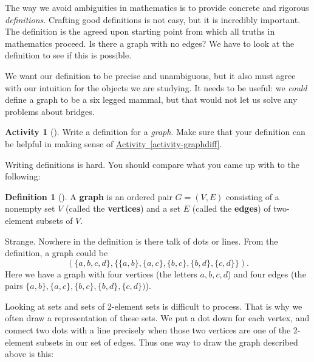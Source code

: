 \documentclass[10pt,]{book}
\newcommand{\terminology}[1]{\textbf{#1}}
\theoremstyle{plain}
\theoremstyle{definition}
\newtheorem{definition}[theorem]{Definition}
\theoremstyle{definition}
\theoremstyle{definition}
\newtheorem{activity}[project]{Activity}
\numberwithin{equation}{chapter}
\newcommand{\vtx}[2]{node[fill,circle,inner sep=0pt, minimum size=4pt,label=#1:#2]{}}
\newcommand{\vr}[1]{\vtx{right}{#1}}
\newcommand{\vl}[1]{\vtx{left}{#1}}
\begin{document}
\hypertarget{p-1265}{}%
The way we avoid ambiguities in mathematics is to provide concrete and rigorous \emph{definitions}.  Crafting good definitions is not easy, but it is incredibly important.  The definition is the agreed upon starting point from which all truths in mathematics proceed.  Is there a graph with no edges?  We have to look at the definition to see if this is possible.%
\par
\hypertarget{p-1266}{}%
We want our definition to be precise and unambiguous, but it also must agree with our intuition for the objects we are studying.  It needs to be useful: we \emph{could} define a graph to be a six legged mammal, but that would not let us solve any problems about bridges.%
\begin{activity}[]\label{activity-268}
\hypertarget{p-1267}{}%
Write a definition for a \emph{graph}.  Make sure that your definition can be helpful in making sense of \hyperref[activity-graphdiff]{Activity~\ref{activity-graphdiff}}.%
\end{activity}
\hypertarget{p-1268}{}%
Writing definitions is hard.  You should compare what you came up with to the following:%
\begin{definition}[{}]\label{definition-3}
\hypertarget{p-1269}{}%
A \terminology{graph} is an ordered pair \(G = (V, E)\) consisting of a nonempty set \(V\) (called the \terminology{vertices}) and a set \(E\) (called the \terminology{edges}) of two-element subsets of \(V\).%
\end{definition}
\hypertarget{p-1270}{}%
Strange.  Nowhere in the definition is there talk of dots or lines.  From the definition, a graph could be%
\begin{equation*}
(\{a,b,c,d\}, \{\{a,b\}, \{a,c\}, \{b,c\}, \{b,d\}, \{c,d\}\}).
\end{equation*}
Here we have a graph with four vertices  (the letters \(a, b, c, d\)) and four edges (the pairs \(\{a,b\}, \{a,c\}, \{b,c\}, \{b,d\}, \{c,d\})\)).%
\par
\hypertarget{p-1271}{}%
Looking at sets and sets of 2-element sets is difficult to process.  That is why we often draw a representation of these sets.  We put a dot down for each vertex, and connect two dots with a line precisely when those two vertices are one of the 2-element subsets in our set of edges.  Thus one way to draw the graph described above is this:%
\begin{sidebyside}{1}{0.375}{0.375}{0}
\begin{sbspanel}{0.25}
\resizebox{\linewidth}{!}{{
\begin{tikzpicture}[scale=0.7]
   \draw  (-1,1) \vl{\(a\)} -- (1,1) \vr{\(b\)} (-1,1) -- (-1,-1) \vl{\(c\)} -- (1,-1) \vr{\(d\)} -- (1,1) -- (-1,-1);
 \end{tikzpicture}
}
}
\end{sbspanel}
\end{sidebyside}
\end{document}
